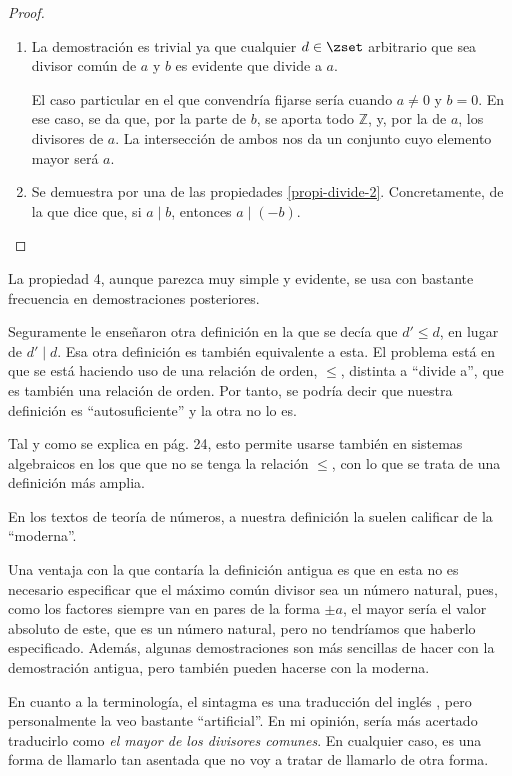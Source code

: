 \begin{proof}
\begin{enumerate}
    \item La demostración es trivial ya que cualquier $d \in \zset$
      arbitrario que sea divisor común de $a$ y $b$ es evidente que divide a
      $a$.

      El caso particular en el que convendría fijarse sería cuando $a \neq
      0$ y $b = 0$. En ese caso, se da que, por la parte de $b$, se aporta
      todo $\mathbb{Z}$, y, por la de $a$, los divisores de $a$. La
      intersección de ambos nos da un conjunto cuyo elemento mayor será $a$.

    \item Se demuestra por una de las propiedades \ref{propi-divide-2}.
      Concretamente, de la que dice que, si $a \mid b$, entonces $a \mid
      ({-b})$.
      \qedhere
  \end{enumerate}
\end{proof}

La propiedad 4, aunque parezca muy simple y evidente, se usa con bastante
frecuencia en demostraciones posteriores.

Seguramente le enseñaron otra definición en la que se decía que $d' \leq d$,
en lugar de $d' \mid d$. Esa otra definición es también equivalente a esta.
El problema está en que se está haciendo uso de una relación de orden,
$\leq$, distinta a ``divide a'', que es también una relación de orden. Por
tanto, se podría decir que nuestra definición es ``autosuficiente'' y la
otra no lo es.

Tal y como se explica en \cite{burton} pág. 24, esto permite usarse también
en sistemas algebraicos en los que que no se tenga la relación $\leq$, con
lo que se trata de una definición más amplia.

En los textos de teoría de números, a nuestra definición la suelen calificar
de la ``moderna''.

Una ventaja con la que contaría la definición antigua es que en esta no es
necesario especificar que el máximo común divisor sea un número natural,
pues, como los factores siempre van en pares de la forma $\pm a$, el mayor
sería el valor absoluto de este, que es un número natural, pero no
tendríamos que haberlo especificado. Además, algunas demostraciones son más
sencillas de hacer con la demostración antigua, pero también pueden hacerse
con la moderna.

En cuanto a la terminología, el sintagma  es una
traducción del inglés , pero personalmente la
veo bastante ``artificial''. En mi opinión, sería más acertado traducirlo
como \emph{el mayor de los divisores comunes}. En cualquier caso, es una
forma de llamarlo tan asentada que no voy a tratar de llamarlo de otra
forma.

